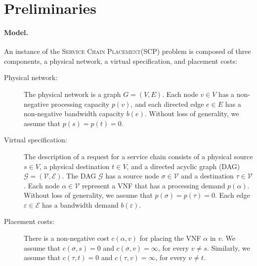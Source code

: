 \documentclass[runningheads]{llncs}
\newcommand{\eps}{\varepsilon}
\newcommand{\scp}{\textsc{SCP}\xspace}
\newcommand{\scplong}{\textsc{Service Chain Placement}\xspace}
\newcommand{\calE}{\mathcal{E}}
\newcommand{\calG}{\mathcal{G}}
\newcommand{\calV}{\mathcal{V}}
\begin{document}

\section{Preliminaries}

\paragraph*{Model.}
%
An instance of the \scplong (\scp) problem is composed of three
components, a physical network, a virtual specification, and placement
costs:
\begin{description}
\item[Physical network:]
%
  The physical network is a graph $G = (V,E)$.  Each node $v \in V$
  has a non-negative processing capacity $p(v)$, and each directed
  edge $e \in E$ has a non-negative bandwidth capacity $b(e)$.
%
  Without loss of generality, we assume that $p(s) = p(t) = 0$.  

\medskip
  
\item[Virtual specification:]
%
  The description of a request for a service chain consists of a
  physical source $s \in V$, a physical destination $t \in V$, and a
  directed acyclic graph (DAG) $\calG = (\calV,\calE)$.
%
  The DAG $\calG$ has a source node $\sigma \in \calV$ and a
  destination $\tau \in \calV$. Each node $\alpha \in \calV$ represent
  a VNF that has a processing demand $p(\alpha)$.
%
  Without loss of generality, we assume that $p(\sigma) = p(\tau) =
  0$.  Each edge $\eps \in \calE$ has a bandwidth demand $b(\eps)$.

\medskip
  
\item[Placement costs:]
%
  There is a non-negative cost $c(\alpha,v)$ for placing the VNF
  $\alpha$ in $v$.  We assume that $c(\sigma,s) = 0$ and $c(\sigma,v)
  = \infty$, for every $v \neq s$.  Similarly, we assume that
  $c(\tau,t) = 0$ and $c(\tau,v) = \infty$, for every $v \neq t$.
\end{description}
\end{document}
